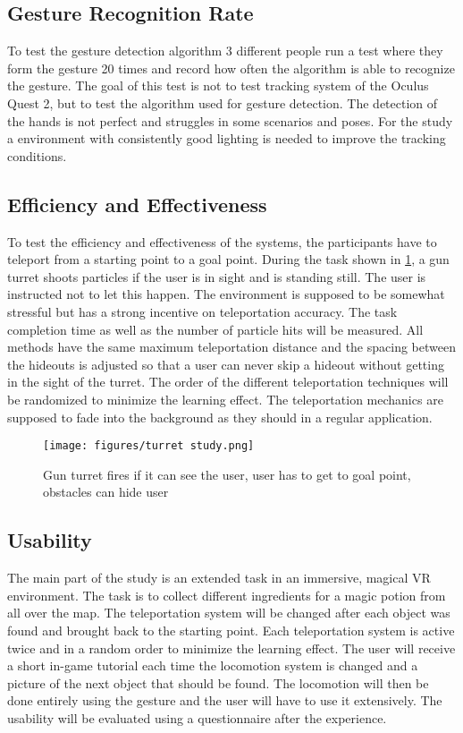 \subsection{Gesture Recognition Rate}
To test the gesture detection algorithm 3 different people run a test where they form the gesture 20 times and record how often the algorithm is able to recognize the gesture.
The goal of this test is not to test tracking system of the Oculus Quest 2, but to test the algorithm used for gesture detection. The detection of the hands is not perfect and struggles in some scenarios and poses. For the study a environment with consistently good lighting is needed to improve the tracking conditions. 


\subsection{Efficiency and Effectiveness}
To test the efficiency and effectiveness of the systems, the participants have to teleport from a starting point to a goal point. During the task shown in \ref{fig:turret}, a gun turret shoots particles if the user is in sight and is standing still. The user is instructed not to let this happen. The environment is supposed to be somewhat stressful but has a strong incentive on teleportation accuracy. The task completion time as well as the number of particle hits will be measured. All methods have the same maximum teleportation distance and the spacing between the hideouts is adjusted so that a user can never skip a hideout without getting in the sight of the turret. The order of the different teleportation techniques will be randomized to minimize the learning effect. The teleportation mechanics are supposed to fade into the background as they should in a regular application. 

\begin{figure}[htb]
    \centering
    \texttt{[image: figures/turret study.png]}
    \caption{Gun turret fires if it can see the user, user has to get to goal point, obstacles can hide user}
    \label{fig:turret}
\end{figure}


\subsection{Usability}
The main part of the study is an extended task in an immersive, magical VR environment.
The task is to collect different ingredients for a magic potion from all over the map. The teleportation system will be changed after each object was found and brought back to the starting point. Each teleportation system is active twice and in a random order to minimize the learning effect. The user will receive a short in-game tutorial each time the locomotion system is changed and a picture of the next object that should be found. The locomotion will then be done entirely using the gesture and the user will have to use it extensively. The usability will be evaluated using a questionnaire after the experience. 



